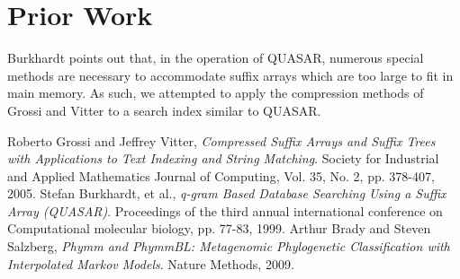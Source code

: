 \documentclass{article}
\begin{document}
\section{Prior Work}
Burkhardt \cite{B99} points out that, in the operation of QUASAR, numerous special methods are necessary to accommodate suffix arrays which are too large to fit in main memory. As such, we attempted to apply the compression methods of Grossi and Vitter \cite{GV05} to a search index similar to QUASAR.\\
\begin{thebibliography}{1}
	Roberto Grossi and Jeffrey Vitter,
	\emph{Compressed Suffix Arrays and Suffix Trees with Applications to Text Indexing and String Matching}.
	Society for Industrial and Applied Mathematics Journal of Computing,
	Vol. 35, No. 2, pp. 378-407,
	2005.
	Stefan Burkhardt, et al.,
	\emph{q-gram Based Database Searching Using a Suffix Array (QUASAR)}.
	Proceedings of the third annual international conference on Computational molecular biology,
	pp. 77-83,
	1999.
	Arthur Brady and Steven Salzberg,
	\emph{Phymm and PhymmBL: Metagenomic Phylogenetic Classification with Interpolated Markov Models}.
	Nature Methods,
	2009.
\end{thebibliography}
\end{document}
